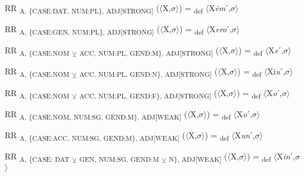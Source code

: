 {\begin{exe}
 RR \textsubscript{A, \{CASE:DAT, NUM:PL\}, ADJ[STRONG]} ($\langle$X,$\sigma $$\rangle$) = \textsubscript{def} $\langle$X\textit{\=em}ˊ,$\sigma $$\rangle$
\end{exe}

\begin{exe}
 RR \textsubscript{A, \{CASE:GEN, NUM:PL\}, ADJ[STRONG]} ($\langle$X,$\sigma $$\rangle$) = \textsubscript{def} $\langle$X\textit{ero}ˊ,$\sigma $$\rangle$
\end{exe}

\begin{exe}
 RR \textsubscript{A, \{CASE:NOM} \textsubscript{${\veebar}$} \textsubscript{ACC, NUM:PL, GEND:M\}, ADJ[STRONG]} ($\langle$X,$\sigma $$\rangle$) = \textsubscript{def} $\langle$X\textit{e}ˊ,$\sigma $$\rangle$
\end{exe}

\begin{exe}
 RR \textsubscript{A, \{CASE:NOM} \textsubscript{${\veebar}$} \textsubscript{ACC, NUM:PL, GEND:N\}, ADJ[STRONG]} ($\langle$X,$\sigma $$\rangle$) = \textsubscript{def} $\langle$Xi\textit{u}ˊ,$\sigma $$\rangle$
\end{exe}

\begin{exe}
 RR \textsubscript{A, \{CASE:NOM} \textsubscript{${\veebar}$} \textsubscript{ACC, NUM:PL, GEND:F\}, ADJ[STRONG]} ($\langle$X,$\sigma $$\rangle$) = \textsubscript{def} $\langle$X\textit{o}ˊ,$\sigma $$\rangle$
\end{exe}

\begin{exe}
 RR \textsubscript{A, \{CASE:NOM, NUM:SG, GEND:M\}, ADJ[WEAK]} ($\langle$X,$\sigma $$\rangle$) = \textsubscript{def} $\langle$X\textit{o}ˊ,$\sigma $$\rangle$
\end{exe}

\begin{exe}
 RR \textsubscript{A, \{CASE:ACC, NUM:SG, GEND:M\}, ADJ[WEAK]} ($\langle$X,$\sigma $$\rangle$) = \textsubscript{def} $\langle$X\textit{un}ˊ,$\sigma $$\rangle$
\end{exe}

\begin{exe}
 RR \textsubscript{A, \{CASE: DAT} \textsubscript{${\veebar}$} \textsubscript{GEN, NUM:SG, GEND:M} \textsubscript{${\veebar}$} \textsubscript{N\}, ADJ[WEAK]} ($\langle$X,$\sigma $$\rangle$) = \textsubscript{def} $\langle$X\textit{in}ˊ,$\sigma $$\rangle$
\end{exe}

}
